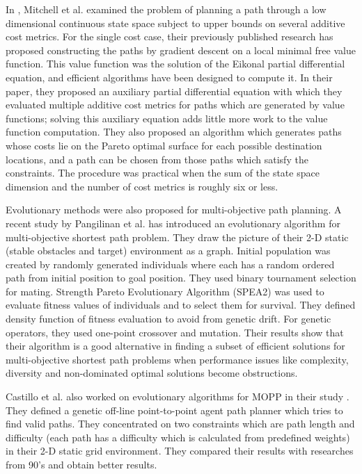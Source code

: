 \documentclass[10pt,journal]{IEEEtran}
\begin{document}
In \cite{Mitchell:2009}, Mitchell et al. examined the problem of planning a path through a low dimensional continuous state space subject to upper bounds on several additive cost metrics. For the single cost case, their previously published research has proposed constructing the paths by gradient descent on a local minimal free value function. This value function was the solution of the Eikonal partial differential equation, and efficient algorithms have been designed to compute it. In their paper, they proposed an auxiliary partial differential equation with which they evaluated multiple additive cost metrics for paths which are generated by value functions; solving this auxiliary equation adds little more work to the value function computation. They also proposed an algorithm which generates paths whose costs lie on the Pareto optimal surface for each possible destination locations, and a path can be chosen from those paths which satisfy the constraints. The procedure was practical when the sum of the state space dimension and the number of cost metrics is roughly six or less.

Evolutionary methods were also proposed for multi-objective path planning. A recent study by Pangilinan et al. \cite{Pangilinan} has introduced an evolutionary algorithm for multi-objective shortest path problem. They draw the picture of their 2-D static (stable obstacles and target) environment as a graph. Initial population was created by randomly generated individuals where each has a random ordered path from initial position to goal position. They used binary tournament selection for mating. Strength Pareto Evolutionary Algorithm (SPEA2) \cite{spea2:2001} was used to evaluate fitness values of individuals and to select them for survival. They defined density function of fitness evaluation to avoid from genetic drift. For genetic operators, they used one-point crossover and mutation. Their results show that their algorithm is a good alternative in finding a subset of efficient solutions for multi-objective shortest path problems when performance issues like complexity, diversity and non-dominated optimal solutions become obstructions.

Castillo et al. also worked on evolutionary algorithms for MOPP in their study \cite{Castillo:2007}. They defined a genetic off-line point-to-point agent path planner which tries to find valid paths. They concentrated on two constraints which are path length and difficulty (each path has a difficulty which is calculated from predefined weights) in their 2-D static grid environment. They compared their results with researches from 90's and obtain better results.
\end{document}
